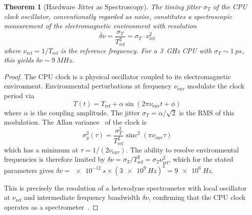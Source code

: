 \documentclass[twocolumn,10pt]{article}
\newtheorem{theorem}{Theorem}[section]
\theoremstyle{definition}
\theoremstyle{remark}
\begin{document}
\begin{theorem}[Hardware Jitter as Spectroscopy]\label{thm:jitter-spectroscopy}
The timing jitter $\sigma_T$ of the CPU clock oscillator, conventionally
regarded as noise, constitutes a spectroscopic measurement of the
electromagnetic environment with resolution
\begin{equation}\label{eq:jitter-resolution}
  \delta\nu = \frac{\sigma_T}{T_{\mathrm{ref}}^2} = \sigma_T \cdot \nu_{\mathrm{ref}}^2
\end{equation}
where $\nu_{\mathrm{ref}} = 1/T_{\mathrm{ref}}$ is the reference frequency.
For a \SI{3}{GHz} CPU with $\sigma_T \sim \SI{1}{ps}$, this yields
$\delta\nu \sim \SI{9}{MHz}$.
\end{theorem}

\begin{proof}
The CPU clock is a physical oscillator coupled to its electromagnetic
environment. Environmental perturbations at frequency $\nu_{\mathrm{env}}$
modulate the clock period via
\begin{equation}
  T(t) = T_{\mathrm{ref}} + \alpha \sin(2\pi \nu_{\mathrm{env}} t + \phi)
\end{equation}
where $\alpha$ is the coupling amplitude. The jitter $\sigma_T = \alpha /
\sqrt{2}$ is the RMS of this modulation. The Allan
variance~\cite{allan1966} of the clock is
\begin{equation}
  \sigma_y^2(\tau) = \frac{\sigma_T^2}{T_{\mathrm{ref}}^2}
  \operatorname{sinc}^2(\pi \nu_{\mathrm{env}} \tau)
\end{equation}
which has a minimum at $\tau = 1/(2\nu_{\mathrm{env}})$. The ability to
resolve environmental frequencies is therefore limited by
$\delta\nu = \sigma_T / T_{\mathrm{ref}}^2 = \sigma_T \nu_{\mathrm{ref}}^2$,
which for the stated parameters gives
$\delta\nu = \SI{e-12}{s} \times (\SI{3e9}{Hz})^2 = \SI{9e6}{Hz}$.

This is precisely the resolution of a heterodyne spectrometer with local
oscillator at $\nu_{\mathrm{ref}}$ and intermediate frequency bandwidth
$\delta\nu$, confirming that the CPU clock operates as a
spectrometer~\cite{herzberg1945}.
\end{proof}
\end{document}
